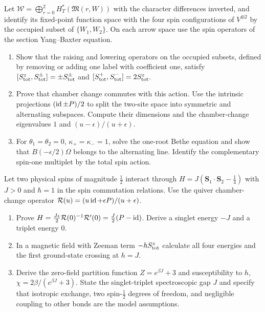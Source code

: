\begin{exercise}
Let $\mathcal W=\bigoplus_{r=0}^2
H_T^*(\mathfrak M(r,W))$ with the character differences inverted,
and identify its fixed-point function space with the four spin
configurations of $V^{\otimes2}$ by the occupied subset of
$\{W_1,W_2\}$. On each arrow space use the spin operators of
the section Yang--Baxter equation.
\begin{enumerate}[label=(\alph*)]
\item Show that the raising and lowering operators on the
occupied subsets, defined by removing or adding one label
with coefficient one, satisfy
$[S^z_{\rm tot},S^\pm_{\rm tot}]=\pm S^\pm_{\rm tot}$ and
$[S^+_{\rm tot},S^-_{\rm tot}]=2S^z_{\rm tot}$.
\item Prove that chamber change commutes with this action.
Use the intrinsic projections $(\operatorname{id}\pm P)/2$ to split the
two-site space into symmetric and alternating subspaces.
Compute their dimensions and the chamber-change eigenvalues
$1$ and $(u-\epsilon)/(u+\epsilon)$.
\item For $\theta_1=\theta_2=0$, $\kappa_+=\kappa_-=1$,
solve the one-root Bethe equation and show that
$B(-\epsilon/2)\Omega$ belongs to the alternating line.
Identify the complementary spin-one multiplet by the total
spin action.
\end{enumerate}
\end{exercise}

\begin{exercise}
Let two physical spins of magnitude $\tfrac12$ interact through
$H=J(\mathbf S_1\cdot\mathbf S_2-\tfrac14)$ with $J>0$
and $\hbar=1$ in the spin commutation relations.
Use the quiver chamber-change operator
$\mathcal R(u)=(u\operatorname{id}+\epsilon P)/(u+\epsilon)$.
\begin{enumerate}[label=(\alph*)]
\item Prove
$H=\frac{J\epsilon}{2}\mathcal R(0)^{-1}\mathcal R'(0)
=\frac J2(P-\operatorname{id})$.
Derive a singlet energy $-J$ and a triplet energy $0$.
\item In a magnetic field with Zeeman term
$-hS^z_{\rm tot}$ calculate all four energies and the first
ground-state crossing at $h=J$.
\item Derive the zero-field partition function
$Z=e^{\beta J}+3$ and susceptibility to $h$,
$\chi=2\beta/(e^{\beta J}+3)$.
State the singlet-triplet spectroscopic gap $J$ and specify
that isotropic exchange, two spin-$\tfrac12$ degrees of freedom,
and negligible coupling to other bonds are the model assumptions.
\end{enumerate}
\end{exercise}
